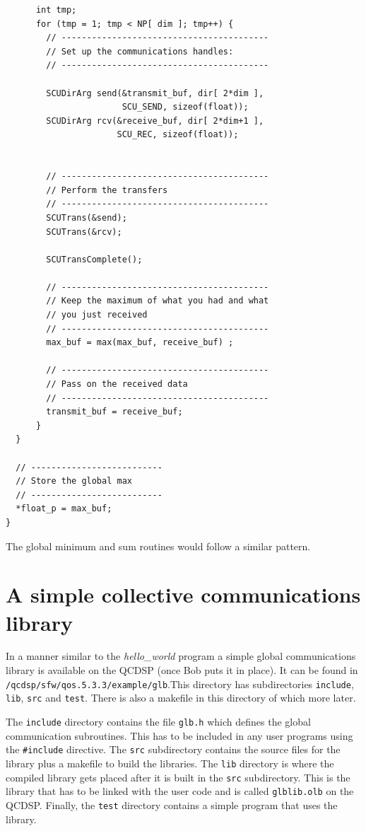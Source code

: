 \begin{verbatim}
      int tmp;
      for (tmp = 1; tmp < NP[ dim ]; tmp++) {
        // -----------------------------------------
        // Set up the communications handles:
        // -----------------------------------------

        SCUDirArg send(&transmit_buf, dir[ 2*dim ],
                       SCU_SEND, sizeof(float));
        SCUDirArg rcv(&receive_buf, dir[ 2*dim+1 ],
                      SCU_REC, sizeof(float));


        // -----------------------------------------
        // Perform the transfers
        // -----------------------------------------
        SCUTrans(&send);
        SCUTrans(&rcv);

        SCUTransComplete();

        // -----------------------------------------
        // Keep the maximum of what you had and what
        // you just received
        // -----------------------------------------
        max_buf = max(max_buf, receive_buf) ;

        // -----------------------------------------
        // Pass on the received data
        // -----------------------------------------
        transmit_buf = receive_buf;
      }
  }

  // --------------------------
  // Store the global max
  // --------------------------
  *float_p = max_buf;
}
\end{verbatim}
The global minimum and sum routines would follow a similar pattern.

\section{A simple collective communications library}
In a manner similar to the {\em hello\_world} program a simple
global communications library is available on the QCDSP (once 
Bob puts it in place). It can be found in {\tt /qcdsp/sfw/qos.5.3.3/example/glb}.This directory has subdirectories {\tt include}, {\tt lib}, {\tt src} and {\tt test}. There is also a makefile in this directory of which more later.

The {\tt include} directory contains the file {\tt glb.h} which defines
the global communication subroutines. This has to be included in any 
user programs using the {\tt \#include} directive. The {\tt src} 
subdirectory contains the source files for the library plus a makefile
to build the libraries. The {\tt lib} directory is where the compiled
library gets placed after it is built in the {\tt src} subdirectory. 
This is the library that has to be linked with the user code and
is called {\tt glblib.olb} on the QCDSP. Finally, the {\tt test} 
directory contains a simple program that uses the library.

